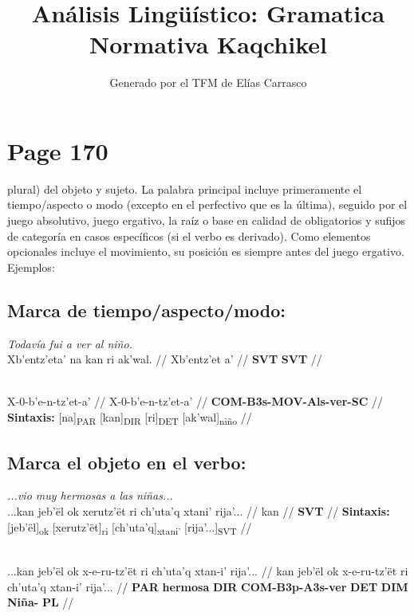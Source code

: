 \documentclass{article}%
\title{Análisis Lingüístico: Gramatica Normativa Kaqchikel}%
\author{Generado por el TFM de Elías Carrasco}%
\begin{document}
%
\normalsize%
\maketitle%
\section{Page 170}%
\label{sec:Page170}%
plural) del objeto y sujeto. La palabra principal incluye primeramente el tiempo/aspecto %
o modo (excepto en el perfectivo que es la última), seguido por el juego absolutivo, %
juego ergativo, la raíz o base en calidad de obligatorios y sufijos de categoría en casos %
específicos (si el verbo es derivado). Como elementos opcionales incluye el movimiento, %
su posición es siempre antes del juego ergativo. Ejemplos: %
\subsection{Marca de tiempo/aspecto/modo:}%
\label{subsec:Marcadetiempo/aspecto/modo}%

%
\par\medskip%
\ex
\textit{Todavía fui a ver al niño.} \\
\begingl
\gla Xb'entz'eta' na kan ri ak'wal. //
\glb Xb'entz'et a' //
\glc \textbf{SVT} \textbf{SVT} //
\endgl
\xe
%
\medskip%
\par\medskip%
\ex
\textit{} \\
\begingl
\gla X-0-b'e-n-tz'et-a' //
\glb X-0-b'e-n-tz'et-a' //
\glc \textbf{COM-}\textbf{B3s-}\textbf{MOV-}\textbf{Als-}\textbf{ver-}\textbf{SC} //
\glft \textbf{Sintaxis:} [na]\textsubscript{PAR} [kan]\textsubscript{DIR} [ri]\textsubscript{DET} [ak'wal]\textsubscript{niño} //
\endgl
\xe
%
\medskip%
\subsection{Marca el objeto en el verbo:}%
\label{subsec:Marcaelobjetoenelverbo}%

%
\par\medskip%
\ex
\textit{...vio muy hermosas a las niñas...} \\
\begingl
\gla ...kan jeb'ël ok xerutz'ët ri ch'uta'q xtani' rija'... //
\glb kan //
\glc \textbf{SVT} //
\glft \textbf{Sintaxis:} [jeb'ël]\textsubscript{ok} [xerutz'ët]\textsubscript{ri} [ch'uta'q]\textsubscript{xtani'} [rija'...]\textsubscript{SVT} //
\endgl
\xe
%
\medskip%
\par\medskip%
\ex
\textit{} \\
\begingl
\gla ...kan jeb'ël ok x-e-ru-tz'ët ri ch'uta'q xtan-i' rija'... //
\glb kan jeb'ël ok x-e-ru-tz'ët ri ch'uta'q xtan-i' rija'... //
\glc \textbf{PAR} \textbf{hermosa} \textbf{DIR} \textbf{COM-}\textbf{B3p-}\textbf{A3s-}\textbf{ver} \textbf{DET} \textbf{DIM} \textbf{Niña-} \textbf{PL} //
\endgl
\xe
%
\medskip%
\end{document}

